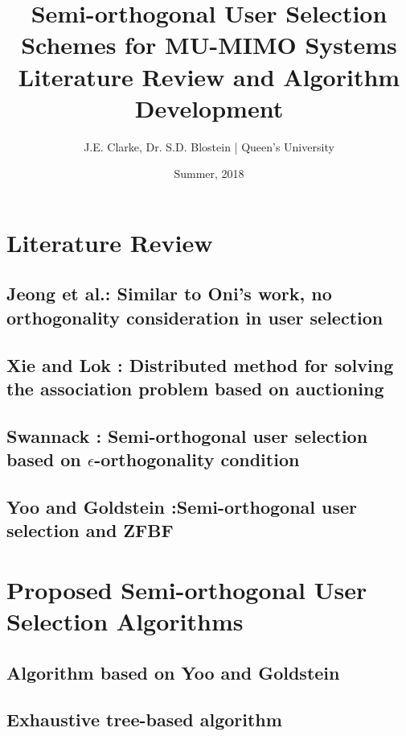 \documentclass[11pt]{article}
\title{Semi-orthogonal User Selection Schemes for MU-MIMO Systems\\ Literature Review and Algorithm Development}
\author{J.E. Clarke, Dr. S.D. Blostein | Queen's University}
\date{Summer, 2018}
\begin{document}
	\maketitle
	\newpage
    \section{Literature Review}
    	\subsection{Jeong et al.\cite{7354607}: Similar to Oni's work, no orthogonality consideration in user selection}
            	
        \subsection{Xie and Lok \cite{7510766}: Distributed method for solving the association problem based on auctioning}
            
    
        \subsection{Swannack \cite{1549555}: Semi-orthogonal user selection based on $\epsilon$-orthogonality condition}
            
            
        \subsection{Yoo and Goldstein \cite{1603708}:Semi-orthogonal user selection and ZFBF }
            
    
    \section{Proposed Semi-orthogonal User Selection Algorithms}
        
        \subsection{Algorithm based on Yoo and Goldstein \cite{1603708}}
            
        \subsection{Exhaustive tree-based algorithm}
            
	
    
    \newpage	
 	\begingroup
 		\renewcommand{\section}[2]{}%
 		
 		
 	\endgroup
\end{document}
